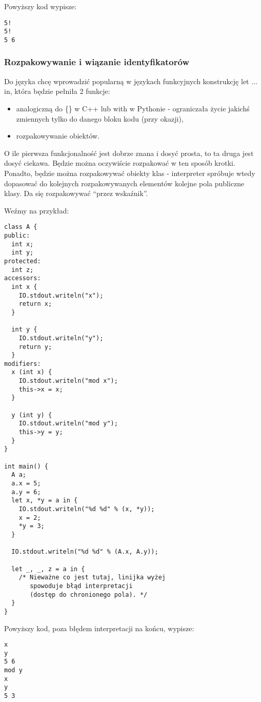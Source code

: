 \documentclass[a4paper,10pt]{scrartcl}
\begin{document}
Powyższy kod wypisze:
\begin{lstlisting}
5!
5!
5 6
\end{lstlisting}

\subsubsection{Rozpakowywanie i wiązanie identyfikatorów}
Do języka chcę wprowadzić popularną w językach funkcyjnych konstrukcję let ... in, która będzie pełniła 2 funkcje:
\begin{itemize}
  \item analogiczną do \{\} w C++ lub with w Pythonie - ograniczała życie jakichś zmiennych tylko do danego bloku kodu (przy okazji),
  \item rozpakowywanie obiektów.
\end{itemize}

O ile pierwsza funkcjonalność jest dobrze znana i dosyć prosta, to ta druga jest dosyć ciekawa. Będzie można oczywiście rozpakować w ten sposób
krotki. Ponadto, będzie można rozpakowywać obiekty klas - interpreter spróbuje wtedy dopasować do kolejnych rozpakowywanych elementów kolejne pola
publiczne klasy. Da się rozpakowywać ``przez wskaźnik''.

Weźmy na przykład:
\begin{lstlisting}
class A {
public:
  int x;
  int y;
protected:
  int z;
accessors:
  int x {
    IO.stdout.writeln("x");
    return x;
  }
  
  int y {
    IO.stdout.writeln("y");
    return y;
  }
modifiers:
  x (int x) {
    IO.stdout.writeln("mod x");
    this->x = x;
  }
  
  y (int y) {
    IO.stdout.writeln("mod y");
    this->y = y;
  }
}

int main() {
  A a;
  a.x = 5;
  a.y = 6;
  let x, *y = a in {
    IO.stdout.writeln("%d %d" % (x, *y));
    x = 2;
    *y = 3;
  }
  
  IO.stdout.writeln("%d %d" % (A.x, A.y));
  
  let _, _, z = a in {
    /* Nieważne co jest tutaj, linijka wyżej
       spowoduje błąd interpretacji 
       (dostęp do chronionego pola). */
  }
}
\end{lstlisting}
Powyższy kod, poza błędem interpretacji na końcu, wypisze:

\begin{lstlisting}
x
y
5 6
mod y
x
y
5 3
\end{lstlisting}
\end{document}
